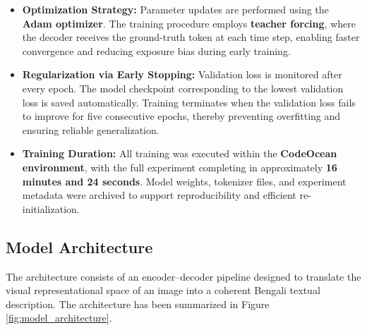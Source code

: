 \begin{itemize}
    Here, $y_t$ denotes the ground-truth token at step $t$, and $P(y_t \mid y_{1:t-1}, I)$ represents the probability assigned by the decoder given previous tokens and the encoded image $I$. Padding tokens are masked to ensure accurate loss computation.

    \item \textbf{Optimization Strategy:}
    Parameter updates are performed using the \textbf{Adam optimizer}. The training procedure employs \textbf{teacher forcing}, where the decoder receives the ground-truth token at each time step, enabling faster convergence and reducing exposure bias during early training.

    \item \textbf{Regularization via Early Stopping:}
    Validation loss is monitored after every epoch. The model checkpoint corresponding to the lowest validation loss is saved automatically. Training terminates when the validation loss fails to improve for five consecutive epochs, thereby preventing overfitting and ensuring reliable generalization.

    \item \textbf{Training Duration:}
    All training was executed within the \textbf{CodeOcean environment}, with the full experiment completing in approximately \textbf{16 minutes and 24 seconds}. Model weights, tokenizer files, and experiment metadata were archived to support reproducibility and efficient re-initialization.
\end{itemize}

\subsection{Model Architecture}

The architecture consists of an encoder--decoder pipeline designed to translate the visual representational space of an image into a coherent Bengali textual description. The architecture has been summarized in Figure \ref{fig:model_architecture}.

